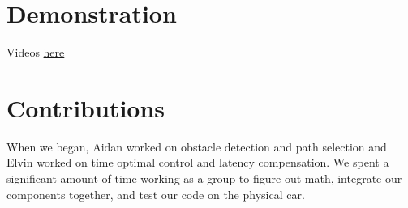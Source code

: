 \documentclass[11pt]{article}
\begin{document}
\section{Demonstration}
Videos \href{https://drive.google.com/drive/folders/1Z8qGX_YRjMb96KEpW027cGvmGeLOB8BU}{here}

\section{Contributions}

When we began, Aidan worked on obstacle detection and path selection and Elvin
worked on time optimal control and latency compensation. We spent a significant
amount of time working as a group to figure out math, integrate our
components together, and test our code on the physical car.
\end{document}
